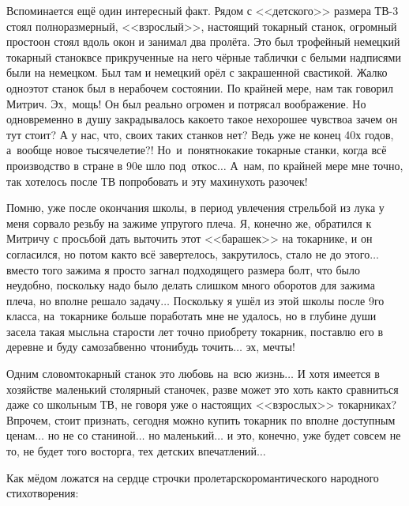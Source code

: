 Вспоминается ещё один интересный факт. Рядом с <<детского>> размера ТВ-3 стоял полноразмерный, <<взрослый>>, настоящий токарный станок, огромный просто\mdash он стоял вдоль окон и занимал два пролёта. Это был трофейный немецкий токарный станок\mdash все прикрученные на него чёрные таблички с белыми надписями были на немецком. Был там и немецкий орёл с закрашенной свастикой. Жалко одно\mdash этот станок был в нерабочем состоянии. По крайней мере, нам так говорил Митрич. Эх,~мощь! Он был реально огромен и потрясал воображение. Но одновременно в душу закрадывалось какое\sdash то такое нехорошее чувство\mdash а зачем он тут стоит? А у нас, что, своих таких станков нет? Ведь уже не конец 40\sdash х годов, а~вообще новое тысячелетие?! Но~и~понятно\mdash какие токарные станки, когда всё производство в стране в 90\sdash е шло под~откос$\ldots$ А~нам, по крайней мере мне точно, так хотелось после ТВ попробовать и эту махину\mdash хоть разочек! 

Помню, уже после окончания школы, в период увлечения стрельбой из лука у меня сорвало резьбу на зажиме упругого плеча. Я, конечно же, обратился к Митричу с просьбой дать выточить этот <<барашек>> на токарнике, и он согласился, но потом как\sdash то всё завертелось, закрутилось, стало не до этого$\ldots$ вместо того зажима я просто загнал подходящего размера болт, что было неудобно, поскольку надо было делать слишком много оборотов для зажима плеча, но вполне решало задачу$\ldots$ Поскольку я ушёл из этой школы после 9\sdash го класса, на~токарнике больше поработать мне не удалось, но в глубине души засела такая мысль\mdash на старости лет точно приобрету токарник, поставлю его в деревне и буду самозабвенно что\sdash нибудь точить$\ldots$ эх, мечты!

Одним словом\mdash токарный станок это любовь на~всю жизнь$\ldots$ И хотя имеется в хозяйстве маленький столярный станочек, разве может это хоть как\sdash то сравниться даже со школьным ТВ, не говоря уже о настоящих <<взрослых>> токарниках? Впрочем, стоит признать, сегодня можно купить токарник по вполне доступным ценам$\ldots$ но не со станиной$\ldots$ но маленький$\ldots$ и это, конечно, уже будет совсем не то, не будет того восторга, тех детских впечатлений$\ldots$

Как мёдом ложатся на сердце строчки пролетарско\sdash романтического народного стихотворения:

